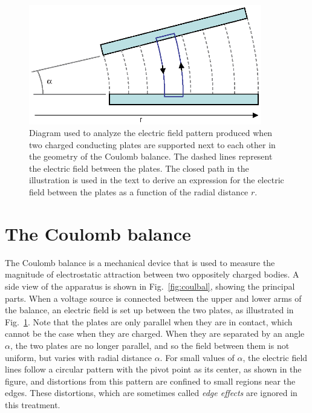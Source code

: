 \documentclass{revtex4}
\begin{document}
\begin{figure}
\includegraphics[width=4in]{efield.eps}
\caption{\label{fig:efield}
Diagram used to analyze the electric field pattern produced when two charged
conducting plates are supported next to each other in the geometry of the
Coulomb balance.  The dashed lines represent the electric field between the
plates.  The closed path in the illustration is used in the text to derive
an expression for the electric field between the plates as a function of
the radial distance $r$.
}
\end{figure}

\section{The Coulomb balance}

The Coulomb balance is a mechanical device that is used to measure the
magnitude of electrostatic attraction between two oppositely charged
bodies.  A side view of the apparatus is shown in Fig.~\ref{fig:coulbal},
showing the principal parts.  When a voltage source is connected between
the upper and lower arms of the balance, an electric field is set up between
the two plates, as illustrated in Fig.~\ref{fig:efield}.  Note that the
plates are only parallel when they are in contact, which cannot be the
case when they are charged.  When they are separated by an angle $\alpha$,
the two plates are no longer parallel, and so the field between them is
not uniform, but varies with radial distance $\alpha$.  For small values
of $\alpha$, the electric field lines follow a circular pattern with the
pivot point as its center, as shown in the figure, and distortions from
this pattern are confined to small regions near the edges.  These
distortions, which are sometimes called {\em edge effects} are ignored
in this treatment.
\end{document}
